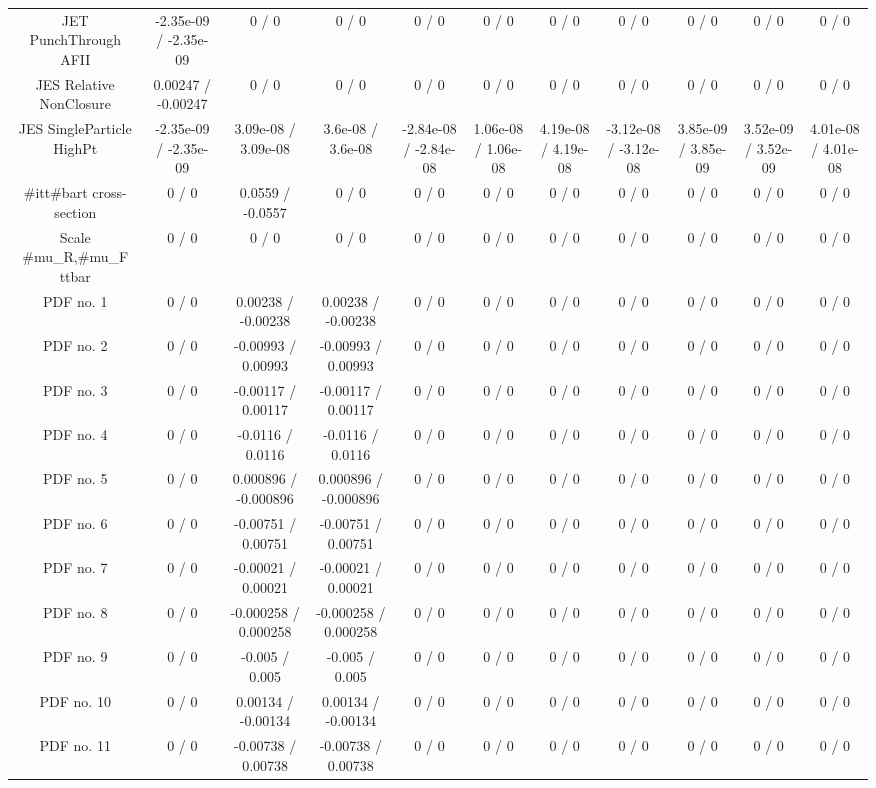 \begin{table}[htbp]
\begin{center}
\begin{tabular}{|c|c|c|c|c|c|c|c|c|c|c|}
  JET PunchThrough AFII & -2.35e-09 / -2.35e-09 & 0 / 0 & 0 / 0 & 0 / 0 & 0 / 0 & 0 / 0 & 0 / 0 & 0 / 0 & 0 / 0 & 0 / 0 \\ 
  JES Relative NonClosure & 0.00247 / -0.00247 & 0 / 0 & 0 / 0 & 0 / 0 & 0 / 0 & 0 / 0 & 0 / 0 & 0 / 0 & 0 / 0 & 0 / 0 \\ 
  JES SingleParticle HighPt & -2.35e-09 / -2.35e-09 & 3.09e-08 / 3.09e-08 & 3.6e-08 / 3.6e-08 & -2.84e-08 / -2.84e-08 & 1.06e-08 / 1.06e-08 & 4.19e-08 / 4.19e-08 & -3.12e-08 / -3.12e-08 & 3.85e-09 / 3.85e-09 & 3.52e-09 / 3.52e-09 & 4.01e-08 / 4.01e-08 \\ 
  #it{t#bar{t}} cross-section & 0 / 0 & 0.0559 / -0.0557 & 0 / 0 & 0 / 0 & 0 / 0 & 0 / 0 & 0 / 0 & 0 / 0 & 0 / 0 & 0 / 0 \\ 
  Scale #mu_{R},#mu_{F} ttbar & 0 / 0 & 0 / 0 & 0 / 0 & 0 / 0 & 0 / 0 & 0 / 0 & 0 / 0 & 0 / 0 & 0 / 0 & 0 / 0 \\ 
  PDF no. 1 & 0 / 0 & 0.00238 / -0.00238 & 0.00238 / -0.00238 & 0 / 0 & 0 / 0 & 0 / 0 & 0 / 0 & 0 / 0 & 0 / 0 & 0 / 0 \\ 
  PDF no. 2 & 0 / 0 & -0.00993 / 0.00993 & -0.00993 / 0.00993 & 0 / 0 & 0 / 0 & 0 / 0 & 0 / 0 & 0 / 0 & 0 / 0 & 0 / 0 \\ 
  PDF no. 3 & 0 / 0 & -0.00117 / 0.00117 & -0.00117 / 0.00117 & 0 / 0 & 0 / 0 & 0 / 0 & 0 / 0 & 0 / 0 & 0 / 0 & 0 / 0 \\ 
  PDF no. 4 & 0 / 0 & -0.0116 / 0.0116 & -0.0116 / 0.0116 & 0 / 0 & 0 / 0 & 0 / 0 & 0 / 0 & 0 / 0 & 0 / 0 & 0 / 0 \\ 
  PDF no. 5 & 0 / 0 & 0.000896 / -0.000896 & 0.000896 / -0.000896 & 0 / 0 & 0 / 0 & 0 / 0 & 0 / 0 & 0 / 0 & 0 / 0 & 0 / 0 \\ 
  PDF no. 6 & 0 / 0 & -0.00751 / 0.00751 & -0.00751 / 0.00751 & 0 / 0 & 0 / 0 & 0 / 0 & 0 / 0 & 0 / 0 & 0 / 0 & 0 / 0 \\ 
  PDF no. 7 & 0 / 0 & -0.00021 / 0.00021 & -0.00021 / 0.00021 & 0 / 0 & 0 / 0 & 0 / 0 & 0 / 0 & 0 / 0 & 0 / 0 & 0 / 0 \\ 
  PDF no. 8 & 0 / 0 & -0.000258 / 0.000258 & -0.000258 / 0.000258 & 0 / 0 & 0 / 0 & 0 / 0 & 0 / 0 & 0 / 0 & 0 / 0 & 0 / 0 \\ 
  PDF no. 9 & 0 / 0 & -0.005 / 0.005 & -0.005 / 0.005 & 0 / 0 & 0 / 0 & 0 / 0 & 0 / 0 & 0 / 0 & 0 / 0 & 0 / 0 \\ 
  PDF no. 10 & 0 / 0 & 0.00134 / -0.00134 & 0.00134 / -0.00134 & 0 / 0 & 0 / 0 & 0 / 0 & 0 / 0 & 0 / 0 & 0 / 0 & 0 / 0 \\ 
  PDF no. 11 & 0 / 0 & -0.00738 / 0.00738 & -0.00738 / 0.00738 & 0 / 0 & 0 / 0 & 0 / 0 & 0 / 0 & 0 / 0 & 0 / 0 & 0 / 0 \\ 

\end{tabular}
\end{center}
\end{table}
